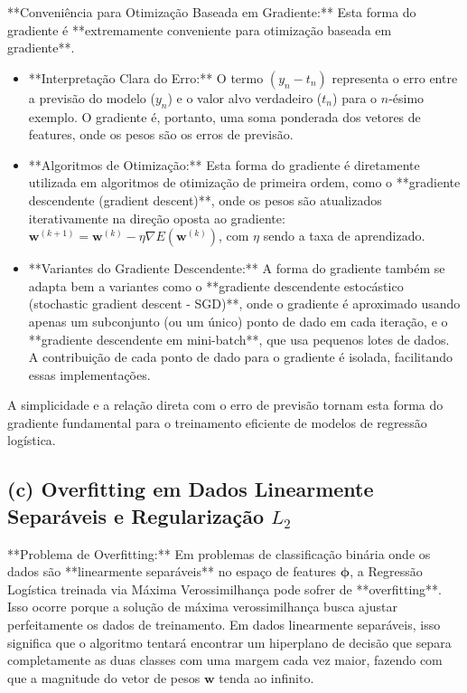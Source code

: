 \documentclass{article}
\begin{document}
**Conveniência para Otimização Baseada em Gradiente:** Esta forma do gradiente é **extremamente conveniente para otimização baseada em gradiente**.
\begin{itemize}
    \item **Interpretação Clara do Erro:** O termo $(y_n - t_n)$ representa o erro entre a previsão do modelo ($y_n$) e o valor alvo verdadeiro ($t_n$) para o $n$-ésimo exemplo. O gradiente é, portanto, uma soma ponderada dos vetores de features, onde os pesos são os erros de previsão.
    \item **Algoritmos de Otimização:** Esta forma do gradiente é diretamente utilizada em algoritmos de otimização de primeira ordem, como o **gradiente descendente (gradient descent)**, onde os pesos são atualizados iterativamente na direção oposta ao gradiente: $\mathbf{w}^{(k+1)} = \mathbf{w}^{(k)} - \eta \nabla E(\mathbf{w}^{(k)})$, com $\eta$ sendo a taxa de aprendizado.
    \item **Variantes do Gradiente Descendente:** A forma do gradiente também se adapta bem a variantes como o **gradiente descendente estocástico (stochastic gradient descent - SGD)**, onde o gradiente é aproximado usando apenas um subconjunto (ou um único) ponto de dado em cada iteração, e o **gradiente descendente em mini-batch**, que usa pequenos lotes de dados. A contribuição de cada ponto de dado para o gradiente é isolada, facilitando essas implementações.
\end{itemize}
A simplicidade e a relação direta com o erro de previsão tornam esta forma do gradiente fundamental para o treinamento eficiente de modelos de regressão logística.

\subsection*{(c) Overfitting em Dados Linearmente Separáveis e Regularização $L_2$}

**Problema de Overfitting:** Em problemas de classificação binária onde os dados são **linearmente separáveis** no espaço de features $\boldsymbol{\phi}$, a Regressão Logística treinada via Máxima Verossimilhança pode sofrer de **overfitting**. Isso ocorre porque a solução de máxima verossimilhança busca ajustar perfeitamente os dados de treinamento. Em dados linearmente separáveis, isso significa que o algoritmo tentará encontrar um hiperplano de decisão que separa completamente as duas classes com uma margem cada vez maior, fazendo com que a magnitude do vetor de pesos $\mathbf{w}$ tenda ao infinito.
\end{document}
